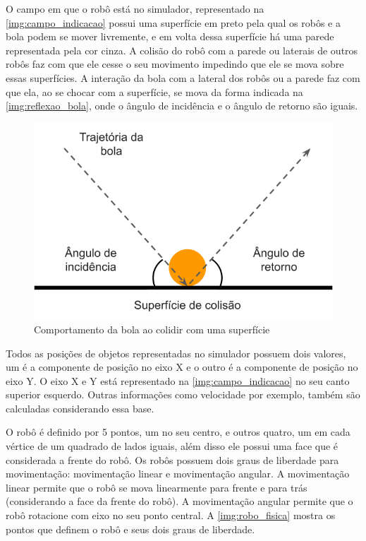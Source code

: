 O campo em que o robô está no simulador, representado na \autoref{img:campo_indicacao} possui uma superfície em preto pela qual os robôs e a bola podem se mover livremente, e em volta dessa superfície há uma parede representada pela cor cinza. A colisão do robô com a parede ou laterais de outros robôs faz com que ele cesse o seu movimento impedindo que ele se mova sobre essas superfícies. A interação da bola com a lateral dos robôs ou a parede faz com que ela, ao se chocar com a superfície, se mova da forma indicada na \autoref{img:reflexao_bola}, onde o ângulo de incidência e o ângulo de retorno são iguais.

\begin{figure}[!htb]
    \caption{\label{img:reflexao_bola}Comportamento da bola ao colidir com uma superfície}
	\begin{center}
        \includegraphics[scale=0.55]{img/colisao_bola.png}
	\end{center}
\end{figure}

Todos as posições de objetos representadas no simulador possuem dois valores, um é a componente de posição no eixo X e o outro é a componente de posição no eixo Y. O eixo X e Y está representado na \autoref{img:campo_indicacao} no seu canto superior esquerdo. Outras informações como velocidade por exemplo, também são calculadas considerando essa base.

O robô é definido por 5 pontos, um no seu centro, e outros quatro, um em cada vértice de um quadrado de lados iguais, além disso ele possui uma face que é considerada a frente do robô. Os robôs possuem dois graus de liberdade para movimentação: movimentação linear e movimentação angular. A movimentação linear permite que o robô se mova linearmente para frente e para trás (considerando a face da frente do robô). A movimentação angular permite que o robô rotacione com eixo no seu ponto central. A \autoref{img:robo_fisica} mostra os pontos que definem o robô e seus dois graus de liberdade. 

